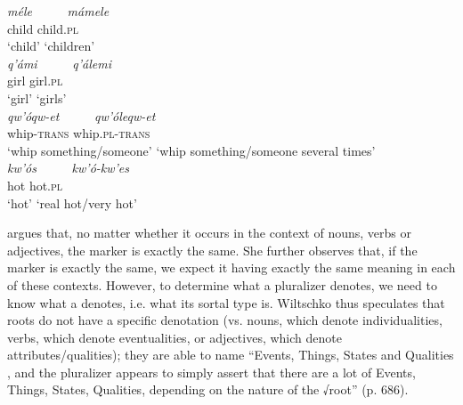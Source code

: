 \documentclass[output=paper]{langsci/langscibook}
\begin{document}
\ea\label{ex:BascianoMelloni:41}
\ea\label{ex:BascianoMelloni:41a}
  \glll\emph{méle}~~~~~  \emph{mámele}\\
   child  child.\textsc{pl}\\
   `child' `children'\\
\ex\label{ex:BascianoMelloni:41b}
\glll  \emph{q'ámi}~~~~~  \emph{q'álemi}\\
   girl  girl.\textsc{pl}\\
   `girl' `girls'\\
\ex\label{ex:BascianoMelloni:41c}
  \glll \emph{qw'óqw-et}~~~~~  \emph{qw'óleqw-et}\\
   whip-\textsc{trans}  whip.\textsc{pl-trans}\\
    {`whip something/someone'} {`whip something/someone several times'}\\
\ex\label{ex:BascianoMelloni:41d}
\glll  \emph{kw'ós}~~~~~  \emph{kw'ó-kw'es}\\
   hot  hot.\textsc{pl}\\
   `hot' {`real hot/very hot'}\\
\z\z


%
\citet{Wiltschko2008} %
%
argues that, no matter whether it occurs in the context
of nouns, verbs or adjectives, the  marker is exactly the same.
She further observes that, if the  marker is exactly the same, we
expect it having exactly the same meaning in each of these contexts.
However, to determine what a  pluralizer denotes, we need to know
what a  denotes, i.e. what its sortal type is. Wiltschko thus
speculates that roots do not have a specific denotation (vs. nouns,
which denote individualities, verbs, which denote eventualities, or
adjectives, which denote attributes/qualities); they are able to name
``Events, Things, States and Qualities %
\citep[see][]{Harley2005}%
%
, and the
pluralizer appears to simply assert that there are a lot of Events,
Things, States, Qualities, depending on the nature of the √root'' (p.
686).
\end{document}
